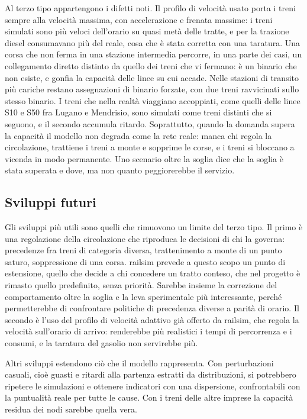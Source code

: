 Al terzo tipo appartengono i difetti noti. Il profilo di velocità usato porta i treni sempre alla velocità massima, con accelerazione e frenata massime: i treni simulati sono più veloci dell'orario su quasi metà delle tratte, e per la trazione diesel consumavano più del reale, cosa che è stata corretta con una taratura. Una corsa che non ferma in una stazione intermedia percorre, in una parte dei casi, un collegamento diretto distinto da quello dei treni che vi fermano: è un binario che non esiste, e gonfia la capacità delle linee su cui accade. Nelle stazioni di transito più cariche restano assegnazioni di binario forzate, con due treni ravvicinati sullo stesso binario. I treni che nella realtà viaggiano accoppiati, come quelli delle linee S10 e S50 fra Lugano e Mendrisio, sono simulati come treni distinti che si seguono, e il secondo accumula ritardo. Soprattutto, quando la domanda supera la capacità il modello non degrada come la rete reale: manca chi regola la circolazione, trattiene i treni a monte e sopprime le corse, e i treni si bloccano a vicenda in modo permanente. Uno scenario oltre la soglia dice che la soglia è stata superata e dove, ma non quanto peggiorerebbe il servizio.

\subsection{Sviluppi futuri}
Gli sviluppi più utili sono quelli che rimuovono un limite del terzo tipo. Il primo è una regolazione della circolazione che riproduca le decisioni di chi la governa: precedenze fra treni di categoria diversa, trattenimento a monte di un punto saturo, soppressione di una corsa. railsim prevede a questo scopo un punto di estensione, quello che decide a chi concedere un tratto conteso, che nel progetto è rimasto quello predefinito, senza priorità. Sarebbe insieme la correzione del comportamento oltre la soglia e la leva sperimentale più interessante, perché permetterebbe di confrontare politiche di precedenza diverse a parità di orario. Il secondo è l'uso del profilo di velocità adattivo già offerto da railsim, che regola la velocità sull'orario di arrivo: renderebbe più realistici i tempi di percorrenza e i consumi, e la taratura del gasolio non servirebbe più.

Altri sviluppi estendono ciò che il modello rappresenta. Con perturbazioni casuali, cioè guasti e ritardi alla partenza estratti da distribuzioni, si potrebbero ripetere le simulazioni e ottenere indicatori con una dispersione, confrontabili con la puntualità reale per tutte le cause. Con i treni delle altre imprese la capacità residua dei nodi sarebbe quella vera.

